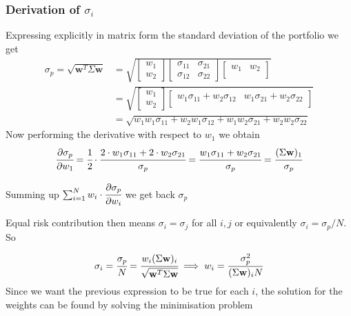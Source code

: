 \begin{attention}
\subsubsection{Derivation of $\sigma_i$}
Expressing explicitly in matrix form the standard deviation of the portfolio we get
\[
\begin{split}
\sigma_p={\sqrt {\mathbf{w}^T\Sigma \mathbf{w}}} & =
\sqrt{
	\begin{bmatrix}
	w_{1} \\
	w_{2}
	\end{bmatrix}
	\begin{bmatrix}
	\sigma_{11} & \sigma_{21} \\
	\sigma_{12} & \sigma_{22} 
	\end{bmatrix}
	\begin{bmatrix}
	w_{1} & w_{2} \\
	\end{bmatrix}
}\\
&=
\sqrt{
	\begin{bmatrix}
	w_{1} \\
	w_{2}
	\end{bmatrix}
	\begin{bmatrix}
w_{1}\sigma_{11} + w_{2}\sigma_{12} & w_{1}\sigma_{21} + w_{2}\sigma_{22} \\
	\end{bmatrix}
} \\
&= \sqrt{
w_{1}w_{1}\sigma_{11} + w_{2}w_{1}\sigma_{12} + w_{1}w_{2}\sigma_{21} + w_{2}w_{2}\sigma_{22} }
\end{split}
\]
Now performing the derivative with respect to $w_1$ we obtain
\[\cfrac{\partial\sigma_p}{\partial w_1} = \cfrac{1}{2}\cdot\cfrac{2\cdot w_1\sigma_{11} + 2\cdot w_{2}\sigma_{21}}{\sigma_p} = \cfrac{w_1\sigma_{11} + w_{2}\sigma_{21}}{\sigma_p} = \cfrac{(\Sigma \mathbf{w})_{1}}{\sigma_p}\]
	
Summing up $\sum_{i=1}^{N} w_i\cdot\cfrac{\partial\sigma_p}{\partial w_i}$ we get back $\sigma_p$
\end{attention}

Equal risk contribution then means \(\sigma _{i} =\sigma _{j}\) for all \(i,j\) or equivalently \(\sigma _{i}=\sigma_p/N\). So

\begin{equation}
\sigma _{i} = \cfrac{\sigma_p}{N}={\cfrac {w_{i}(\Sigma \mathbf{w})_{i}}{\sqrt {\mathbf{w}^T\Sigma \mathbf{w}}}}\implies w_{i} = \frac {\sigma_p^{2}}{(\Sigma \mathbf{w})_{i}N}
\label{eq:risk_parity_weights}
\end{equation}
Since we want the previous expression to be true for each $i$, the solution for the weights can be found by solving the minimisation problem

